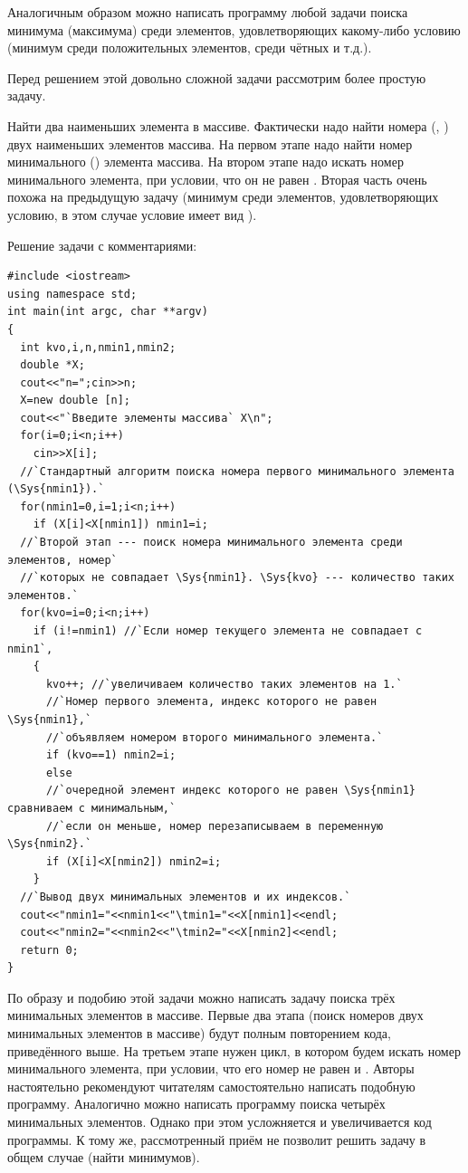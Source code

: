 Аналогичным образом можно написать программу любой задачи поиска минимума (максимума) среди элементов, удовлетворяющих
какому-либо условию (минимум среди положительных элементов, среди чётных и т.д.). 


Перед решением этой довольно сложной задачи рассмотрим более простую задачу.

Найти два наименьших элемента в массиве. Фактически надо найти номера
(, ) двух наименьших элементов
массива. На первом этапе надо найти номер минимального () элемента массива. На втором этапе
надо искать номер минимального элемента, при условии, что он не равен . Вторая часть очень
похожа на предыдущую задачу (минимум среди элементов, удовлетворяющих условию, в этом случае условие имеет вид
).

Решение задачи с комментариями:

\begin{lstlisting}
#include <iostream>
using namespace std;
int main(int argc, char **argv)
{
  int kvo,i,n,nmin1,nmin2;
  double *X;
  cout<<"n=";cin>>n;
  X=new double [n];
  cout<<"`Введите элементы массива` X\n";
  for(i=0;i<n;i++)
    cin>>X[i];
  //`Стандартный алгоритм поиска номера первого минимального элемента (\Sys{nmin1}).`
  for(nmin1=0,i=1;i<n;i++)
    if (X[i]<X[nmin1]) nmin1=i;
  //`Второй этап --- поиск номера минимального элемента среди элементов, номер` 
  //`которых не совпадает \Sys{nmin1}. \Sys{kvo} --- количество таких элементов.`
  for(kvo=i=0;i<n;i++)
    if (i!=nmin1) //`Если номер текущего элемента не совпадает с nmin1`, 
    {
      kvo++; //`увеличиваем количество таких элементов на 1.`
      //`Номер первого элемента, индекс которого не равен \Sys{nmin1},` 
      //`объявляем номером второго минимального элемента.`
      if (kvo==1) nmin2=i; 
      else
      //`очередной элемент индекс которого не равен \Sys{nmin1} сравниваем с минимальным,` 
      //`если он меньше, номер перезаписываем в переменную \Sys{nmin2}.`
      if (X[i]<X[nmin2]) nmin2=i;
    }
  //`Вывод двух минимальных элементов и их индексов.`
  cout<<"nmin1="<<nmin1<<"\tmin1="<<X[nmin1]<<endl;
  cout<<"nmin2="<<nmin2<<"\tmin2="<<X[nmin2]<<endl;
  return 0;
}
\end{lstlisting}


По образу и подобию этой задачи можно написать задачу поиска трёх минимальных элементов в массиве. Первые два этапа
(поиск номеров двух минимальных элементов в массиве) будут полным повторением кода, приведённого выше. На третьем этапе
нужен цикл, в котором будем искать номер минимального элемента, при условии, что его номер не равен
 и . Авторы настоятельно рекомендуют читателям самостоятельно написать
подобную программу. Аналогично можно написать программу поиска четырёх минимальных элементов. Однако при этом
усложняется и увеличивается код программы. К тому же, рассмотренный приём не позволит решить задачу в общем случае
(найти  минимумов). 

